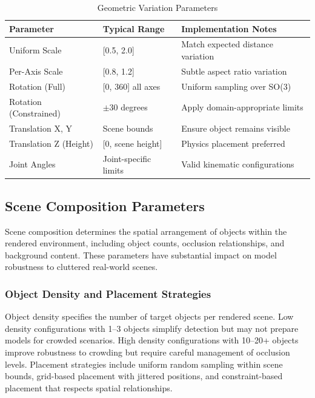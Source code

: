 \begin{table}[htbp]
\centering
\caption{Geometric Variation Parameters}
\label{tab:geometric_params}
\begin{tabular}{p{3.5cm}p{3cm}p{5cm}}
\hline
\textbf{Parameter} & \textbf{Typical Range} & \textbf{Implementation Notes} \\
\hline
Uniform Scale & [0.5, 2.0] & Match expected distance variation \\
Per-Axis Scale & [0.8, 1.2] & Subtle aspect ratio variation \\
Rotation (Full) & [0, 360] all axes & Uniform sampling over SO(3) \\
Rotation (Constrained) & $\pm$30 degrees & Apply domain-appropriate limits \\
Translation X, Y & Scene bounds & Ensure object remains visible \\
Translation Z (Height) & [0, scene height] & Physics placement preferred \\
Joint Angles & Joint-specific limits & Valid kinematic configurations \\
\hline
\end{tabular}
\end{table}

\subsection{Scene Composition Parameters}

Scene composition determines the spatial arrangement of objects within the rendered environment, including object counts, occlusion relationships, and background content. These parameters have substantial impact on model robustness to cluttered real-world scenes.

\subsubsection{Object Density and Placement Strategies}

Object density specifies the number of target objects per rendered scene. Low density configurations with 1--3 objects simplify detection but may not prepare models for crowded scenarios. High density configurations with 10--20+ objects improve robustness to crowding but require careful management of occlusion levels. Placement strategies include uniform random sampling within scene bounds, grid-based placement with jittered positions, and constraint-based placement that respects spatial relationships.

